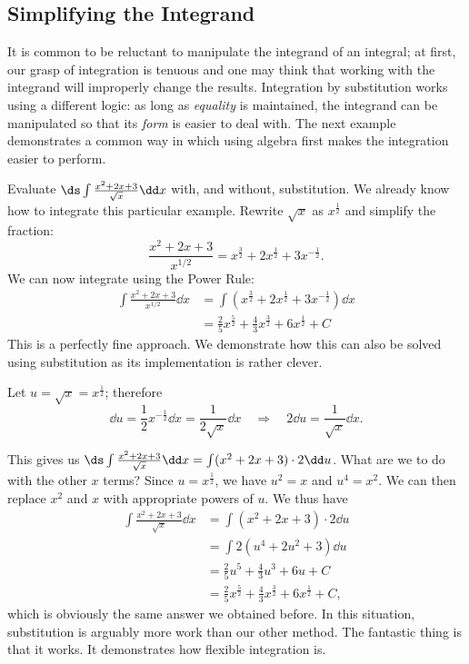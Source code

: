\subsection{Simplifying the Integrand}

It is common to be reluctant to manipulate the integrand of an integral; at first, our grasp of integration is tenuous and one may think that working with the integrand will improperly change the results. Integration by substitution works using a different logic: as long as \emph{equality} is maintained, the integrand can be manipulated so that its \emph{form} is easier to deal with. The next example demonstrates a common way in which using algebra first makes the integration easier to perform.

\begin{example}\label{ex_sub11}
Evaluate $\ds\int \frac{x^2+2x+3}{\sqrt{x}}\dd x$ with, and without, substitution.
\solution
We already know how to integrate this particular example. Rewrite $\sqrt{x}$ as $x^\frac12$ and simplify the fraction:
	\[ \frac{x^2+2x+3}{x^{1/2}} = x^\frac32 + 2x^\frac12 + 3x^{-\frac12}.\]
We can now integrate using the Power Rule:
\begin{align*}
	\int \frac{x^2+2x+3}{x^{1/2}}\dd x &= \int\left(x^\frac32 + 2x^\frac12 + 3x^{-\frac12}\right)\dd x\\
	&=	\frac25x^\frac52 + \frac43x^\frac32 + 6x^\frac12 + C
\end{align*}
This is a perfectly fine approach. We demonstrate how this can also be solved using substitution as its implementation is rather clever.

Let $u = \sqrt{x} = x^\frac12$; therefore 
\[\dd u = \frac12x^{-\frac12}\dd x = \frac{1}{2\sqrt{x}}\dd x \quad \Rightarrow \quad 2\dd u = \frac{1}{\sqrt{x}}\dd x.\]
		
This gives us $\ds \int \frac{x^2+2x+3}{\sqrt{x}}\dd x = \int (x^2+2x+3)\cdot2\dd u$. What are we to do with the other $x$ terms? Since $u=x^{\frac12}$, we have $u^2=x$ and $u^4=x^2$. We can then replace $x^2$ and $x$ with appropriate powers of $u$. We thus have
\begin{align*}
	\int \frac{x^2+2x+3}{\sqrt{x}}\dd x
	&= \int (x^2+2x+3)\cdot2\dd u\\
	&= \int 2(u^4 + 2u^2 + 3)\dd u \\
	&= \frac25u^5 + \frac43u^3 + 6u + C \\
	&= \frac25x^\frac52 + \frac43x^\frac32 + 6x^\frac12+C,
\end{align*}
which is obviously the same answer we obtained before. In this situation, substitution is arguably more work than our other method. The fantastic thing is that it works. It demonstrates how flexible integration is.
\end{example}


